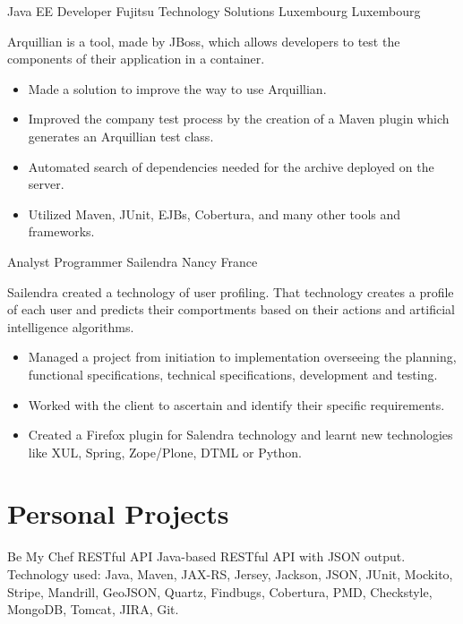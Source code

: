 \documentclass[12pt,a4paper]{moderncv}
\begin{document}
		{Java EE Developer}
		{Fujitsu Technology Solutions}
		{Luxembourg}
		{Luxembourg}
		{Arquillian is a tool, made by JBoss, which allows developers to test the components of their application in a container.
		\begin{itemize}[label=\textbullet]
		    \item Made a solution to improve the way to use Arquillian.
		    \item Improved the company test process by the creation of a Maven plugin which generates an Arquillian test class. 
		    \item Automated search of dependencies needed for the archive deployed on the server.
		    \item Utilized Maven, JUnit, EJBs, Cobertura, and many other tools and frameworks.
	    \end{itemize}
		}{}
				
		{Analyst Programmer}
		{Sailendra}
		{Nancy}
		{France}
		{Sailendra created a technology of user profiling. That technology creates a profile of each user and predicts their comportments based on their actions and artificial intelligence algorithms.
            \begin{itemize}[label=\textbullet]
                \item Managed a project from initiation to implementation overseeing the planning, functional specifications, technical specifications, development and testing.
                \item Worked with the client to ascertain and identify their specific requirements.
                \item Created a Firefox plugin for Salendra technology and learnt new technologies like XUL, Spring, Zope/Plone, DTML or Python.
            \end{itemize}
}{}

\section{Personal Projects}

		{Be My Chef}
		{RESTful API}{}
		{}
		{
		Java-based RESTful API with JSON output.\\
	     Technology used: Java, Maven, JAX-RS, Jersey, Jackson, JSON, JUnit, Mockito, Stripe, Mandrill, GeoJSON, Quartz, Findbugs, Cobertura, PMD, Checkstyle, MongoDB, Tomcat, JIRA, Git.
		}{}
		
\end{document}
